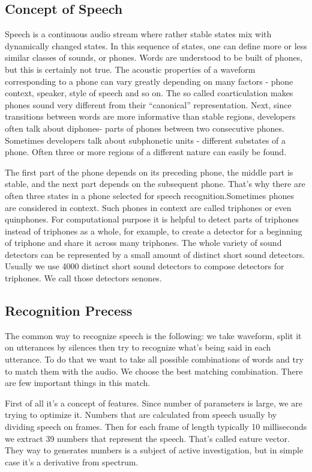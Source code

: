 \documentclass[12pt,a4paper,oldfontcommands]{memoir}
\begin{document}
\subsection{Concept of Speech}
Speech is a continuous audio stream where rather stable states mix with dynamically changed states. In this sequence of states, one can define more or less similar classes of sounds, or phones. Words are understood to be built of phones, but this is certainly not true. The acoustic properties of a waveform corresponding to a phone can vary greatly depending on many factors - phone context, speaker, style of speech and so on. The so called coarticulation makes phones sound very different from their “canonical” representation. Next, since transitions between words are more informative than stable regions, developers often talk about diphones- parts of phones between two consecutive phones. Sometimes developers talk about subphonetic units - different substates of a phone. Often three or more regions of a different nature can easily be found\cite{5}.

The first part of the phone depends on its preceding phone, the middle part is stable, and the next part depends on the subsequent phone. That's why there are often three states in a phone selected for speech recognition.Sometimes phones are considered in context. Such phones in context are called triphones or even quinphones. For computational purpose it is helpful to detect parts of triphones instead of triphones as a whole, for example, to create a detector for a beginning of triphone and share it across many triphones. The whole variety of sound detectors can be represented by a small amount of distinct short sound detectors. Usually we use 4000 distinct short sound detectors to compose detectors for triphones. We call those detectors senones. 


\subsection{Recognition Precess}
 The common way to recognize speech is the following: we take waveform, split it on utterances by silences then try to recognize what's being said in each utterance. To do that we want to take all possible combinations of words and try to match them with the audio. We choose the best matching combination. There are few important things in this match\cite{6}.

First of all it's a concept of features. Since number of parameters is large, we are trying to optimize it. Numbers that are calculated from speech usually by dividing speech on frames. Then for each frame of length typically 10 milliseconds we extract 39 numbers that represent the speech. That's called eature vector. They way to generates numbers is a subject of active investigation, but in simple case it's a derivative from spectrum.
\end{document}
